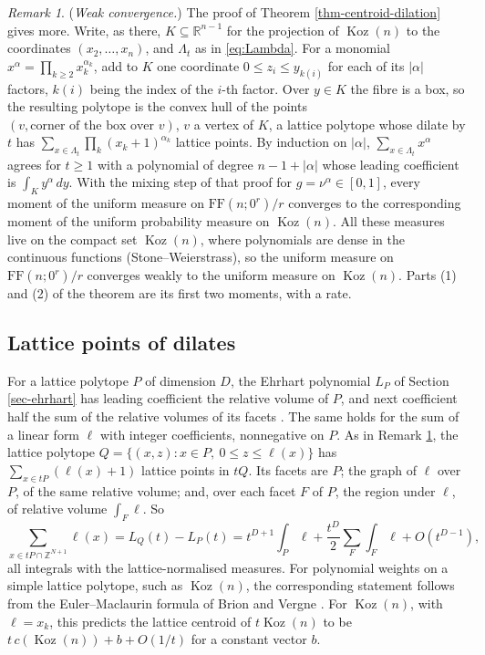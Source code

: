 \documentclass[11pt, a4paper, abstract=yes]{scrartcl}
\theoremstyle{definition}
\theoremstyle{remark}
\newtheorem{remark}[definition]{Remark}
\theoremstyle{plain}
\theoremstyle{remark}
\theoremstyle{plain}
\newcommand{\Koz}{\operatorname{Koz}}
\newcommand{\FF}{\mathrm{FF}}
\let\autocite\cite
\begin{document}
\begin{remark}
(\emph{Weak convergence.}) The proof of Theorem \ref{thm-centroid-dilation} gives more. Write, as there,
\(K\subseteq\mathbb R^{n-1}\) for the projection of \(\Koz(n)\) to the coordinates
\((x_2,\dots,x_n)\), and \(\Lambda_t\) as in \eqref{eq:Lambda}. For a monomial
\(x^\alpha=\prod_{k\ge2}x_k^{\alpha_k}\), add to \(K\) one coordinate \(0\le z_i\le y_{k(i)}\) for each of
its \(\lvert\alpha\rvert\) factors, \(k(i)\) being the index of the \(i\)-th factor. Over \(y\in K\) the
fibre is a box, so the resulting polytope is the
convex hull of the points \((v,\text{corner of the box over }v)\), \(v\) a vertex of \(K\), a lattice
polytope whose dilate by \(t\) has \(\sum_{x\in\Lambda_t}\prod_k(x_k+1)^{\alpha_k}\) lattice points. By
induction on \(\lvert\alpha\rvert\), \(\sum_{x\in\Lambda_t}x^\alpha\) agrees for \(t\ge1\) with a polynomial
of degree \(n-1+\lvert\alpha\rvert\) whose leading coefficient is \(\int_Ky^\alpha\,dy\). With the mixing
step of that proof for \(g=\nu^\alpha\in[0,1]\), every moment of the uniform measure on \(\FF(n;0^r)/r\) converges to
the corresponding moment of the uniform probability measure on \(\Koz(n)\). All these measures live on
the compact set \(\Koz(n)\), where polynomials are dense in the continuous functions
(Stone--Weierstrass), so the uniform measure on \(\FF(n;0^r)/r\) converges weakly to the uniform
measure on \(\Koz(n)\). Parts (1) and (2) of the theorem are its first two moments, with a rate.
\label{rem-weak-convergence}
\end{remark}
\subsection{Lattice points of dilates}
\label{sec:org84c90fa}

For a lattice polytope \(P\) of dimension \(D\), the Ehrhart polynomial \(L_P\) of
Section \ref{sec-ehrhart} has leading coefficient the relative volume of \(P\), and next coefficient
half the sum of the relative volumes of its facets \autocite[Theorem 5.6]{BeckRobins2015}. The same
holds for the sum of a linear form \(\ell\) with integer coefficients, nonnegative on \(P\). As in
Remark \ref{rem-weak-convergence}, the lattice polytope \(Q=\{(x,z):x\in P,\ 0\le z\le\ell(x)\}\) has
\(\sum_{x\in tP}(\ell(x)+1)\) lattice points in \(tQ\). Its facets are \(P\); the graph of \(\ell\)
over \(P\), of the same relative volume; and, over each facet \(F\) of \(P\), the region under
\(\ell\), of relative volume \(\int_F\ell\). So
\[
  \sum_{x\in tP\cap\mathbb Z^{N+1}}\ell(x)=L_Q(t)-L_P(t)
  =t^{D+1}\int_P\ell+\frac{t^D}2\sum_F\int_F\ell+O(t^{D-1}),
\]
all integrals with the lattice-normalised measures. For polynomial weights on a simple lattice
polytope, such as \(\Koz(n)\), the corresponding statement follows from the Euler--Maclaurin formula of Brion and Vergne
\autocite[Theorem 2.15]{BrionVergne1997}. For \(\Koz(n)\), with \(\ell=x_k\), this predicts the lattice
centroid of \(t\Koz(n)\) to be \(t\,c(\Koz(n))+b+O(1/t)\) for a constant vector \(b\).
\end{document}
